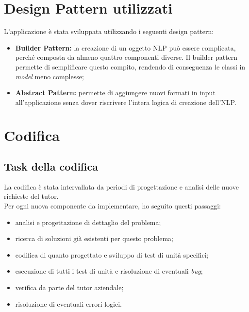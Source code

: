 \section{Design Pattern utilizzati}
L'applicazione è stata sviluppata utilizzando i seguenti design pattern:
\begin{itemize}
    \item \textbf{Builder Pattern:} la creazione di un oggetto NLP può essere complicata, perché composta da almeno quattro componenti diverse. Il builder pattern permette di semplificare questo compito, rendendo di conseguenza le classi in \textit{model} meno complesse;
    \item \textbf{Abstract Pattern:} permette di aggiungere nuovi formati in input all'applicazione senza dover riscrivere l'intera logica di creazione dell'NLP.
\end{itemize}

\section{Codifica}\label{sec:codifica}
\subsection{Task della codifica}
La codifica è stata intervallata da periodi di progettazione e analisi delle nuove richieste del tutor.\\
Per ogni nuova componente da implementare, ho seguito questi passaggi:
\begin{itemize}
    \item analisi e progettazione di dettaglio del problema;
    \item ricerca di soluzioni già esistenti per questo problema;
    \item codifica di quanto progettato e sviluppo di test di unità specifici;
    \item esecuzione di tutti i test di unità e risoluzione di eventuali \textit{bug};
    \item verifica da parte del tutor aziendale;
    \item risoluzione di eventuali errori logici.
\end{itemize}

